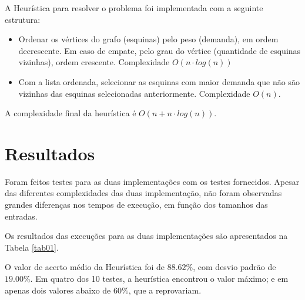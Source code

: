 \documentclass[10pt,a4paper]{article}
\begin{document}
	A Heurística para resolver o problema foi implementada com a seguinte estrutura:

	\begin{itemize}
		\item Ordenar os vértices do grafo (esquinas) pelo peso (demanda), em ordem decrescente. 
		Em caso de empate, pelo grau do vértice (quantidade de esquinas vizinhas), ordem crescente. Complexidade $O(n \cdot log (n))$
		\item Com a lista ordenada, selecionar as esquinas com maior demanda que não são vizinhas das esquinas selecionadas anteriormente. Complexidade $O(n)$.
	\end{itemize}

	A complexidade final da heurística é $O(n + n \cdot log(n))$.

	\section{Resultados}

	Foram feitos testes para as duas implementações com os testes fornecidos. Apesar das diferentes complexidades das duas implementação, não foram observadas 
	grandes diferenças nos tempos de execução, em função dos tamanhos das entradas. 

	Os resultados das execuções para as duas implementações são apresentados na Tabela \ref{tab01}.

	O valor de acerto médio da Heurística foi de $88.62\%$, com desvio padrão de $19.00\%$. 
	Em quatro dos 10 testes, a heurística encontrou o valor máximo; e em apenas dois valores abaixo de $60\%$, que a reprovariam.
\end{document}
